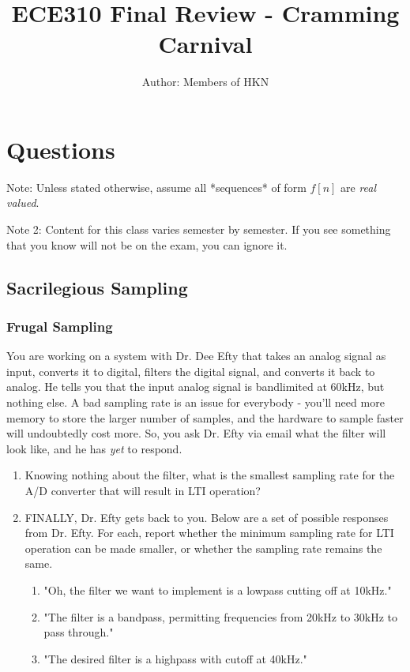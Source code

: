 \documentclass{article}
\title{ECE310 Final Review - Cramming Carnival}
\author{Author: Members of HKN}
\date{}
\begin{document}
\maketitle

\section{Questions}
Note: Unless stated otherwise, assume all *sequences* of form $f[n]$ are \textit{real valued}.

Note 2: Content for this class varies semester by semester. If you see something that you know will not be on the exam, you can ignore it.
\subsection{Sacrilegious Sampling}
\subsubsection{Frugal Sampling}
You are working on a system with Dr. Dee Efty that takes an analog signal as input, converts it to digital, filters the digital signal, and converts it back to analog. He tells you that the input analog signal is bandlimited at 60kHz, but nothing else. A bad sampling rate is an issue for everybody - you'll need more memory to store the larger number of samples, and the hardware to sample faster will undoubtedly cost more. So, you ask Dr. Efty via email what the filter will look like, and he has \textit{yet} to respond.

\begin{enumerate}
    \item Knowing nothing about the filter, what is the smallest sampling rate for the A/D converter that will result in LTI operation? \vspace{1.5cm}
    \item FINALLY, Dr. Efty gets back to you. Below are a set of possible responses from Dr. Efty. For each, report whether the minimum sampling rate for LTI operation can be made smaller, or whether the sampling rate remains the same.
    \begin{enumerate}
        \item "Oh, the filter we want to implement is a lowpass cutting off at 10kHz." \vspace{1.5cm}
        \item "The filter is a bandpass, permitting frequencies from 20kHz to 30kHz to pass through." \vspace{1.5cm}
        \item "The desired filter is a highpass with cutoff at 40kHz." \vspace{1.5cm}

    \end{enumerate}
\end{enumerate}
\end{document}
